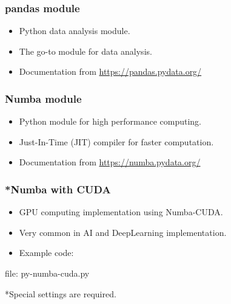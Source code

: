 
\begin{frame}[fragile]
\frametitle{pandas module}

\begin{itemize}
\item Python data analysis module.
\item The go-to module for data analysis.
\item Documentation from \url{https://pandas.pydata.org/}
\end{itemize}

%

\end{frame}


\begin{frame}[fragile]
\frametitle{Numba module}

\begin{itemize}
\item Python module for high performance computing.
\item Just-In-Time (JIT) compiler for faster computation.
\item Documentation from \url{https://numba.pydata.org/}
\end{itemize}

%

\end{frame}


\begin{frame}[fragile]
\frametitle{*Numba with CUDA}

\begin{itemize}
\item GPU computing implementation using Numba-CUDA.
\item Very common in AI and DeepLearning implementation.
\item Example code:
\end{itemize}

\newcommand{\newfilename}{py-numba-cuda.py}

file: \newfilename

*Special settings are required.
\end{frame}

